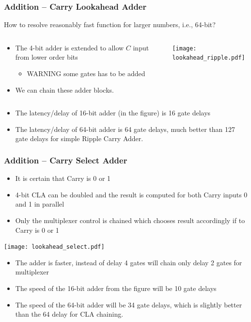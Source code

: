 \documentclass{beamer}
\begin{document}
\begin{frame}
\frametitle{Addition -- Carry Lookahead Adder}

How to resolve reasonably fast function for larger numbers, i.e., 64-bit?

\begin{columns}
\begin{column}{0.45\textwidth}
\begin{itemize}
\item The 4-bit adder is extended to allow $C$ input from lower order bits
\begin{itemize}
\item WARNING some gates has to be added
\end{itemize}
\item We can chain these adder blocks.
\end{itemize}
\end{column}
\begin{column}{0.55\textwidth}
\begin{center}
   \texttt{[image: lookahead\_ripple.pdf]}
\end{center}
\end{column}
\end{columns}


\begin{itemize}
\item The latency/delay of 16-bit adder (in the figure) is 16 gate delays
\item The latency/delay of 64-bit adder is 64 gate delays, much better than 127 gate delays for simple Ripple Carry Adder.
\end{itemize}

\end{frame}


\begin{frame}
\frametitle{Addition -- Carry Select Adder}

\begin{itemize}
\item It is certain that Carry is 0 or 1
\item 4-bit CLA can be doubled and the result is computed for both Carry inputs 0 and 1 in parallel
\item Only the multiplexer control is chained which chooses result accordingly if to Carry is 0 or 1
\end{itemize}
\begin{center}
   \texttt{[image: lookahead\_select.pdf]}
\end{center}

\begin{itemize}
\item The adder is faster, instead of delay 4 gates will chain only delay 2 gates for multiplexer
\item The speed of the 16-bit adder from the figure will be 10 gate delays
\item The speed of the 64-bit adder will be 34 gate delays, which is slightly better than the 64 delay for CLA chaining.
\end{itemize}

\end{frame}
\end{document}
